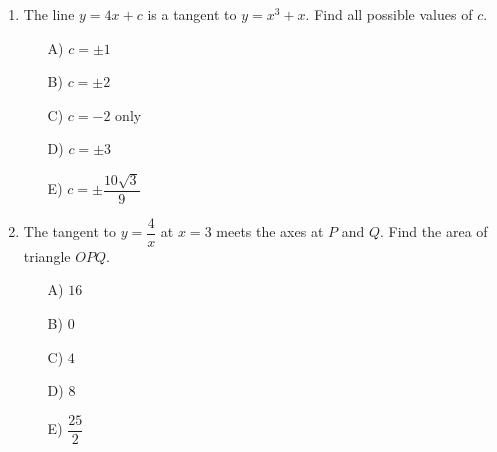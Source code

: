 \documentclass[11pt,a4paper]{article}
\newlength{\ipadheight}
\renewcommand{\ans}[1]{%
  \par\noindent
  \begin{minipage}[t][\ipadheight][t]{\linewidth}%
    \raggedleft\vspace*{\fill}%
    {\fontsize{4}{5}\selectfont\color{black!22}\rotatebox{180}{Ans:~#1}}%
  \end{minipage}%
  \par\vspace{4pt}}
\renewcommand{\method}[1]{}
\renewcommand{\inv}[1]{}
\begin{document}
\begin{enumerate}
\ans{C) $-6$}
\method{$f'=3x^2+2kx$. Parallel tangents at $x=1$ and $x=3$ give $3+2k=27+6k$, so $4k=-24$ and $k=-6$. Decoys: A comes from the sign slip $27-3=6k-2k$; B differentiates $kx^2$ as $kx$, giving $3+k=27+3k$ and $k=-12$; D equates the $y$-values, $1+k=27+9k$, giving $k=-\frac{13}{4}$; E differentiates $kx^2$ as $2k$, so the $k$ terms cancel and no solution exists.}
\inv{Prove that the tangents at $x=p$ and $x=q$ ($p\neq q$) are parallel exactly when $p+q=-\dfrac{2k}{3}$. So parallel tangents pair up symmetrically about $x=-\dfrac{k}{3}$.}

\needspace{11cm}
\item The line $y=4x+c$ is a tangent to $y=x^3+x$. Find all possible values of $c$.
\begin{itemize}
\item[A)] $c=\pm 1$
\item[B)] $c=\pm 2$
\item[C)] $c=-2$ only
\item[D)] $c=\pm 3$
\item[E)] $c=\pm\dfrac{10\sqrt{3}}{9}$
\end{itemize}

\ans{B) $c=\pm 2$}
\method{$f'=3x^2+1$. A tangent of gradient $4$ needs $3x^2+1=4$, so $x=\pm1$. The contact points are $(1,2)$ and $(-1,-2)$. For $y=4x+c$: $2=4+c$ gives $c=-2$, and $-2=-4+c$ gives $c=2$. Thus $c=\pm2$. Decoys: A reports the $x$-coordinates $\pm1$; C keeps only $x=1$; D takes the contact $y$-values from $y=x^3$ (forgetting the $+x$), giving $\pm1-4(\pm1)=\mp3$; E differentiates $x$ as $0$, so $3x^2=4$, giving $x=\pm\frac{2}{\sqrt3}$ and $c=\mp\frac{10\sqrt3}{9}$.}
\inv{For which gradients $m$ does $y=x^3+x$ have exactly one tangent of gradient $m$? Exactly two? None?}

\needspace{11cm}
\item The tangent to $y=\dfrac{4}{x}$ at $x=3$ meets the axes at $P$ and $Q$. Find the area of triangle $OPQ$.
\begin{itemize}
\item[A)] $16$
\item[B)] $0$
\item[C)] $4$
\item[D)] $8$
\item[E)] $\dfrac{25}{2}$
\end{itemize}


\end{enumerate}
\end{document}
